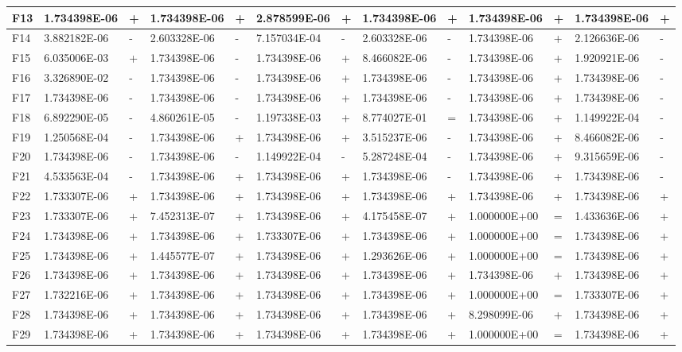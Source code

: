 \documentclass{article} %
\begin{document}
\begin{tabular}{|p{0.3in}|p{0.6in}|p{0.2in}|p{0.6in}|p{0.2in}|p{0.6in}|p{0.2in}|p{0.6in}|p{0.2in}|p{0.6in}|p{0.2in}|p{0.6in}|p{0.2in}|}
F13 & 1.734398E-06 & + & 1.734398E-06 & + & 2.878599E-06 & + & 1.734398E-06 & + & 1.734398E-06 & + & 1.734398E-06 & + \\ \hline 
F14 & 3.882182E-06 & - & 2.603328E-06 & - & 7.157034E-04 & - & 2.603328E-06 & - & 1.734398E-06 & + & 2.126636E-06 & - \\ \hline 
F15 & 6.035006E-03 & + & 1.734398E-06 & - & 1.734398E-06 & + & 8.466082E-06 & - & 1.734398E-06 & + & 1.920921E-06 & - \\ \hline 
F16 & 3.326890E-02 & - & 1.734398E-06 & - & 1.734398E-06 & + & 1.734398E-06 & - & 1.734398E-06 & + & 1.734398E-06 & - \\ \hline 
F17 & 1.734398E-06 & - & 1.734398E-06 & - & 1.734398E-06 & + & 1.734398E-06 & - & 1.734398E-06 & + & 1.734398E-06 & - \\ \hline 
F18 & 6.892290E-05 & - & 4.860261E-05 & - & 1.197338E-03 & + & 8.774027E-01 & = & 1.734398E-06 & + & 1.149922E-04 & - \\ \hline 
F19 & 1.250568E-04 & - & 1.734398E-06 & + & 1.734398E-06 & + & 3.515237E-06 & - & 1.734398E-06 & + & 8.466082E-06 & - \\ \hline 
F20 & 1.734398E-06 & - & 1.734398E-06 & - & 1.149922E-04 & - & 5.287248E-04 & - & 1.734398E-06 & + & 9.315659E-06 & - \\ \hline 
F21 & 4.533563E-04 & - & 1.734398E-06 & + & 1.734398E-06 & + & 1.734398E-06 & - & 1.734398E-06 & + & 1.734398E-06 & - \\ \hline 
F22 & 1.733307E-06 & + & 1.734398E-06 & + & 1.734398E-06 & + & 1.734398E-06 & + & 1.734398E-06 & + & 1.734398E-06 & + \\ \hline 
F23 & 1.733307E-06 & + & 7.452313E-07 & + & 1.734398E-06 & + & 4.175458E-07 & + & 1.000000E+00 & = & 1.433636E-06 & + \\ \hline 
F24 & 1.734398E-06 & + & 1.734398E-06 & + & 1.733307E-06 & + & 1.734398E-06 & + & 1.000000E+00 & = & 1.734398E-06 & + \\ \hline 
F25 & 1.734398E-06 & + & 1.445577E-07 & + & 1.734398E-06 & + & 1.293626E-06 & + & 1.000000E+00 & = & 1.734398E-06 & + \\ \hline 
F26 & 1.734398E-06 & + & 1.734398E-06 & + & 1.734398E-06 & + & 1.734398E-06 & + & 1.734398E-06 & + & 1.734398E-06 & + \\ \hline 
F27 & 1.732216E-06 & + & 1.734398E-06 & + & 1.734398E-06 & + & 1.734398E-06 & + & 1.000000E+00 & = & 1.733307E-06 & + \\ \hline 
F28 & 1.734398E-06 & + & 1.734398E-06 & + & 1.734398E-06 & + & 1.734398E-06 & + & 8.298099E-06 & + & 1.734398E-06 & + \\ \hline 
F29 & 1.734398E-06 & + & 1.734398E-06 & + & 1.734398E-06 & + & 1.734398E-06 & + & 1.000000E+00 & = & 1.734398E-06 & + \\ \hline 
\end{tabular}
\end{document}
